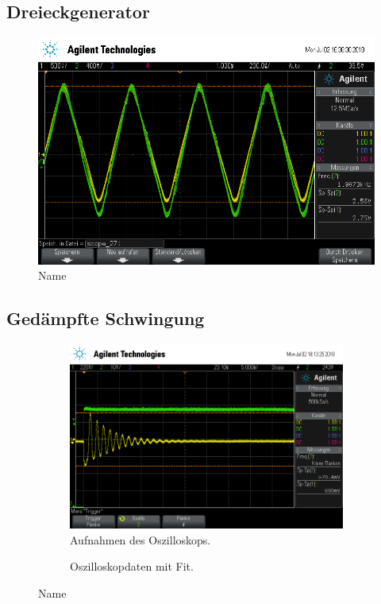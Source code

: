 \subsection{Dreieckgenerator}
\begin{figure}[ht]
  \centering
  \includegraphics[height=0.3\textheight]{data/scope_271.png}
  \caption{Name}
  \label{fig:dreieck_generator}
\end{figure}

\subsection{Ged\"ampfte Schwingung}
\begin{figure}[ht]
  \centering
  \begin{subfigure}{\textwidth}
    \centering
    \includegraphics[height=0.3\textheight]{data/scope_275.png}
    \caption{Aufnahmen des Oszilloskops.}
    \label{fig:}
  \end{subfigure}
  \begin{subfigure}{\textwidth}
    \centering
    
    \caption{Oszilloskopdaten mit Fit.}
    \label{fig:}
  \end{subfigure}
  \caption{Name}
  \label{fig:gedaempft}
\end{figure}
